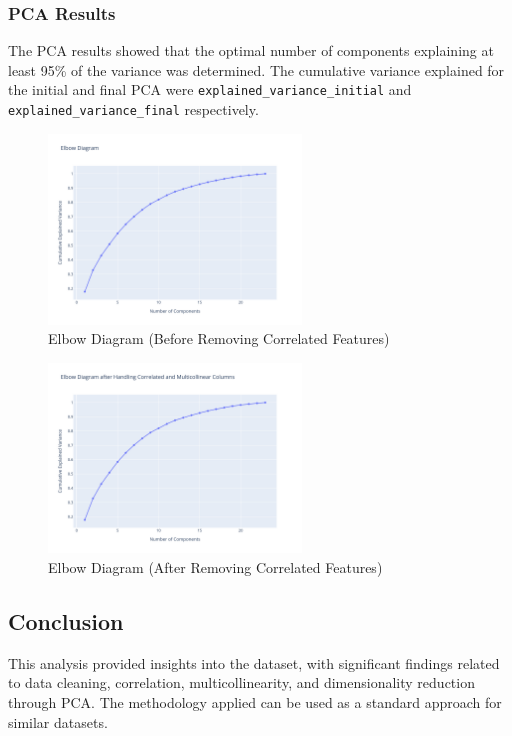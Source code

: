 \subsubsection{PCA Results}
The PCA results showed that the optimal number of components explaining at least 95\% of the variance was determined. The cumulative variance explained for the initial and final PCA were \texttt{explained\_variance\_initial} and \texttt{explained\_variance\_final} respectively.

\begin{figure}[H]
    \centering
    \includegraphics[width=0.6\textwidth]{Images/elbow_diagram_before_vif.png}
    \caption{Elbow Diagram (Before Removing Correlated Features)}
\end{figure}

\begin{figure}[H]
    \centering
    \includegraphics[width=0.6\textwidth]{Images/elbow_diagram_after_vif.png}
    \caption{Elbow Diagram (After Removing Correlated Features)}
\end{figure}

\subsection{Conclusion}
This analysis provided insights into the dataset, with significant findings related to data cleaning, correlation, multicollinearity, and dimensionality reduction through PCA. The methodology applied can be used as a standard approach for similar datasets.

\clearpage